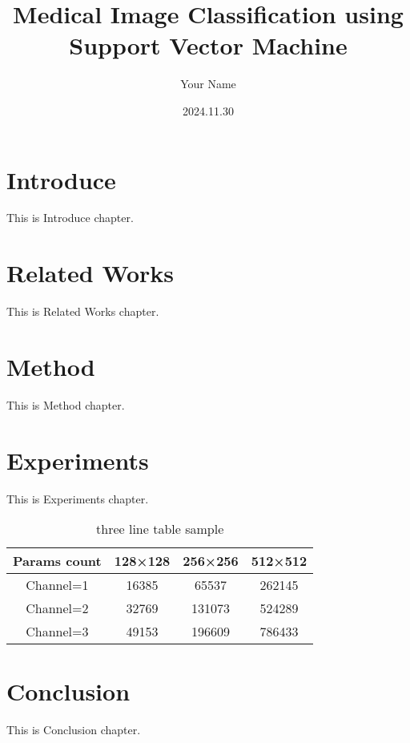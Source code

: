\documentclass[twocolumn]{article}
\title{Medical Image Classification using Support Vector Machine}
\author{Your Name}
\date{2024.11.30}
\begin{document}

\section{Introduce}
This is Introduce chapter.

\section{Related Works}
This is Related Works chapter.

\section{Method}
This is Method chapter.

\section{Experiments}
This is Experiments chapter.
\begin{table}[h]
    \centering
    \caption{three line table sample}
    \begin{tabular}{cccc}
    \toprule
    Params count & 128×128 & 256×256 & 512×512 \\
    \midrule
    Channel=1 & 16385 & 65537 & 262145 \\
    Channel=2 & 32769 & 131073 & 524289 \\
    Channel=3 & 49153 & 196609 & 786433 \\
    \bottomrule
    \end{tabular}
    \end{table}

\section{Conclusion}
This is Conclusion chapter.
\end{document}
